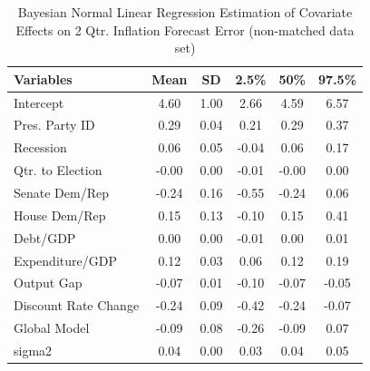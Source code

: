 \documentclass[a4paper]{article}\usepackage{graphicx, color}
\begin{document}
\begin{table}[ht]
\begin{center}
\caption{Bayesian Normal Linear Regression Estimation of Covariate Effects on 2 Qtr. Inflation Forecast Error (non-matched data set)}
\label{OutputNB}
{\small
\begin{tabular}{lccccc}
  \hline
Variables & Mean & SD & 2.5\% & 50\% & 97.5\% \\ 
  \hline
Intercept & 4.60 & 1.00 & 2.66 & 4.59 & 6.57 \\ 
  Pres. Party ID & 0.29 & 0.04 & 0.21 & 0.29 & 0.37 \\ 
  Recession & 0.06 & 0.05 & -0.04 & 0.06 & 0.17 \\ 
  Qtr. to Election & -0.00 & 0.00 & -0.01 & -0.00 & 0.00 \\ 
  Senate Dem/Rep & -0.24 & 0.16 & -0.55 & -0.24 & 0.06 \\ 
  House Dem/Rep & 0.15 & 0.13 & -0.10 & 0.15 & 0.41 \\ 
  Debt/GDP & 0.00 & 0.00 & -0.01 & 0.00 & 0.01 \\ 
  Expenditure/GDP & 0.12 & 0.03 & 0.06 & 0.12 & 0.19 \\ 
  Output Gap & -0.07 & 0.01 & -0.10 & -0.07 & -0.05 \\ 
  Discount Rate Change & -0.24 & 0.09 & -0.42 & -0.24 & -0.07 \\ 
  Global Model & -0.09 & 0.08 & -0.26 & -0.09 & 0.07 \\ 
  sigma2 & 0.04 & 0.00 & 0.03 & 0.04 & 0.05 \\ 
   \hline
\end{tabular}
}
\end{center}
\end{table}





\end{document}
